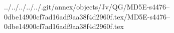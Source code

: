 ../../../../../.git/annex/objects/Jv/QG/MD5E-s4476--0dbe14900cf7ad16adf9aa38f4d2960f.tex/MD5E-s4476--0dbe14900cf7ad16adf9aa38f4d2960f.tex